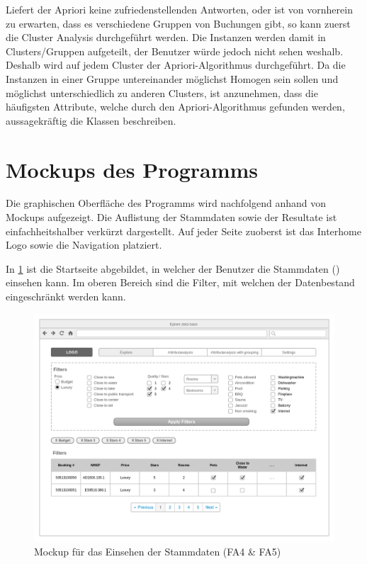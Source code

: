 Liefert der Apriori keine zufriedenstellenden Antworten, oder ist von vornherein zu erwarten, dass es verschiedene Gruppen von Buchungen gibt, so kann zuerst die Cluster Analysis durchgeführt werden. Die Instanzen werden damit in Clusters/Gruppen aufgeteilt, der Benutzer würde jedoch nicht sehen weshalb. Deshalb wird auf jedem Cluster der Apriori-Algorithmus durchgeführt. Da die Instanzen in einer Gruppe untereinander möglichst Homogen sein sollen und möglichst unterschiedlich zu anderen Clusters, ist anzunehmen, dass die häufigsten Attribute, welche durch den Apriori-Algorithmus gefunden werden, aussagekräftig die Klassen beschreiben.

\section{Mockups des Programms}
\label{sec:konzept:mockups}
Die graphischen Oberfläche des Programms wird nachfolgend anhand von Mockups aufgezeigt. Die Auflistung der Stammdaten sowie der Resultate ist einfachheitshalber verkürzt dargestellt. Auf jeder Seite zuoberst ist das Interhome Logo sowie die Navigation platziert.

In \cref{fig:konzept:mockups:stammdaten} ist die Startseite abgebildet, in welcher der Benutzer die Stammdaten () einsehen kann. Im oberen Bereich sind die Filter, mit welchen der Datenbestand eingeschränkt werden kann. 
\begin{figure}[H]
	\RawFloats
	\centering
	\includegraphics[width=1\textwidth]{images/wireframe-explore}
	\caption{Mockup für das Einsehen der Stammdaten (FA4 \& FA5)}
	\label{fig:konzept:mockups:stammdaten}
\end{figure}

